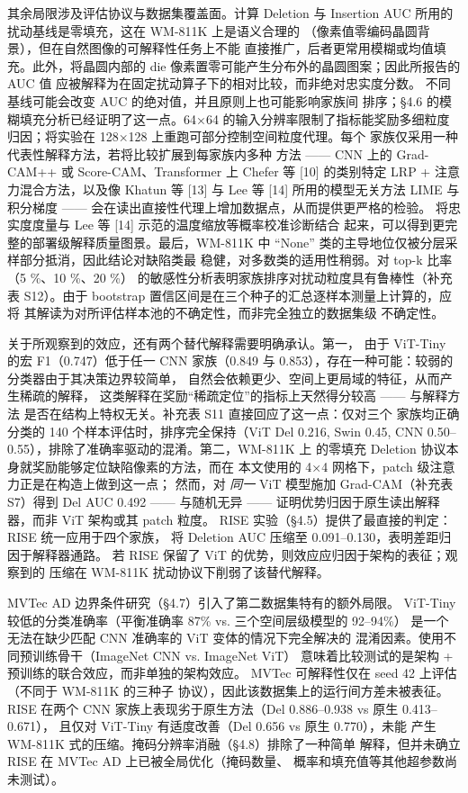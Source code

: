 \documentclass[11pt,a4paper]{article}
\begin{document}
其余局限涉及评估协议与数据集覆盖面。计算 Deletion 与 Insertion AUC 所用的扰动基线是零填充，这在 WM-811K 上是语义合理的 （像素值零编码晶圆背景），但在自然图像的可解释性任务上不能 直接推广，后者更常用模糊或均值填充。此外，将晶圆内部的 die 像素置零可能产生分布外的晶圆图案；因此所报告的 AUC 值 应被解释为在固定扰动算子下的相对比较，而非绝对忠实度分数。 不同基线可能会改变 AUC 的绝对值，并且原则上也可能影响家族间 排序；§4.6 的模糊填充分析已经证明了这一点。64×64 的输入分辨率限制了指标能奖励多细粒度 归因；将实验在 128×128 上重跑可部分控制空间粒度代理。每个 家族仅采用一种代表性解释方法，若将比较扩展到每家族内多种 方法 —— CNN 上的 Grad-CAM++ 或 Score-CAM、Transformer 上 Chefer 等 [10] 的类别特定 LRP + 注意力混合方法，以及像 Khatun 等 [13] 与 Lee 等 [14] 所用的模型无关方法 LIME 与积分梯度 —— 会在读出直接性代理上增加数据点，从而提供更严格的检验。 将忠实度度量与 Lee 等 [14] 示范的温度缩放等概率校准诊断结合 起来，可以得到更完整的部署级解释质量图景。最后，WM-811K 中 “None” 类的主导地位仅被分层采样部分抵消，因此结论对缺陷类最 稳健，对多数类的适用性稍弱。对 top-k 比率（5 \%、10 \%、20 \%） 的敏感性分析表明家族排序对扰动粒度具有鲁棒性（补充表 S12）。由于 bootstrap 置信区间是在三个种子的汇总逐样本测量上计算的，应将 其解读为对所评估样本池的不确定性，而非完全独立的数据集级 不确定性。

关于所观察到的效应，还有两个替代解释需要明确承认。第一， 由于 ViT-Tiny 的宏 F1（0.747）低于任一 CNN 家族（0.849 与 0.853），存在一种可能：较弱的分类器由于其决策边界较简单， 自然会依赖更少、空间上更局域的特征，从而产生稀疏的解释， 这类解释在奖励“稀疏定位”的指标上天然得分较高 —— 与解释方法 是否在结构上特权无关。补充表 S11 直接回应了这一点：仅对三个 家族均正确分类的 140 个样本评估时，排序完全保持（ViT Del 0.216, Swin 0.45, CNN 0.50–0.55），排除了准确率驱动的混淆。第二，WM-811K 上 的零填充 Deletion 协议本身就奖励能够定位缺陷像素的方法，而在 本文使用的 4×4 网格下，patch 级注意力正是在构造上做到这一点； 然而，对 \emph{同一} ViT 模型施加 Grad-CAM（补充表 S7）得到 Del AUC 0.492 —— 与随机无异 —— 证明优势归因于原生读出解释器，而非 ViT 架构或其 patch 粒度。 RISE 实验（§4.5）提供了最直接的判定：RISE 统一应用于四个家族， 将 Deletion AUC 压缩至 0.091–0.130，表明差距归因于解释器通路。 若 RISE 保留了 ViT 的优势，则效应应归因于架构的表征；观察到的 压缩在 WM-811K 扰动协议下削弱了该替代解释。

MVTec AD 边界条件研究（§4.7）引入了第二数据集特有的额外局限。 ViT-Tiny 较低的分类准确率（平衡准确率 87\% vs. 三个空间层级模型的 92--94\%） 是一个无法在缺少匹配 CNN 准确率的 ViT 变体的情况下完全解决的 混淆因素。使用不同预训练骨干（ImageNet CNN vs. ImageNet ViT） 意味着比较测试的是架构 + 预训练的联合效应，而非单独的架构效应。 MVTec 可解释性仅在 seed 42 上评估（不同于 WM-811K 的三种子 协议），因此该数据集上的运行间方差未被表征。RISE 在两个 CNN 家族上表现劣于原生方法（Del 0.886–0.938 vs 原生 0.413–0.671）， 且仅对 ViT-Tiny 有适度改善（Del 0.656 vs 原生 0.770），未能 产生 WM-811K 式的压缩。掩码分辨率消融（§4.8）排除了一种简单 解释，但并未确立 RISE 在 MVTec AD 上已被全局优化（掩码数量、 概率和填充值等其他超参数尚未测试）。
\end{document}
